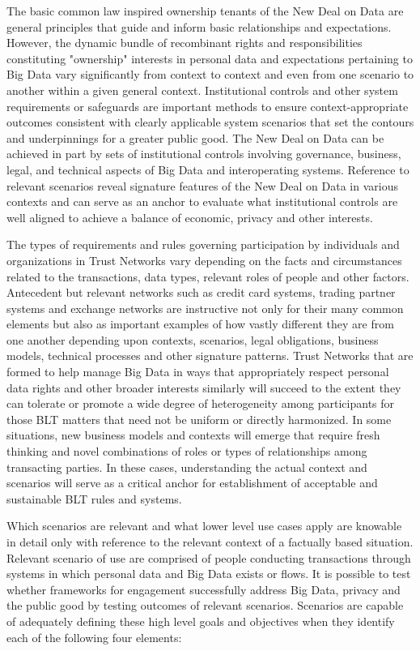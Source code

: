 The basic common law inspired ownership tenants of the New Deal on Data are general principles that guide and inform basic relationships and expectations.
However, the dynamic bundle of recombinant rights and responsibilities constituting "ownership" interests in personal data and expectations pertaining to Big Data vary significantly from context to context and even from one scenario to another within a given general context.  
Institutional controls and other system requirements or safeguards are important methods to ensure context-appropriate outcomes consistent with clearly applicable system scenarios that set the contours and underpinnings for a greater public good.
The New Deal on Data can be achieved in part by sets of institutional controls involving governance, business, legal, and technical aspects of Big Data and interoperating systems.
Reference to relevant scenarios reveal signature features of the New Deal on Data in various contexts and can serve as an anchor to evaluate what institutional controls are well aligned to achieve a balance of economic, privacy and other interests. 

The types of requirements and rules governing participation by individuals and organizations in Trust Networks vary depending on the facts and circumstances related to the transactions, data types, relevant roles of people and other factors. 
Antecedent but relevant networks such as credit card systems, trading partner systems and exchange networks are instructive not only for their many common elements but also as important examples of how vastly different they are from one another depending upon contexts, scenarios, legal obligations, business models, technical processes and other signature patterns.
Trust Networks that are formed to help manage Big Data in ways that appropriately respect personal data rights and other broader interests similarly will succeed to the extent they can tolerate or promote a wide degree of heterogeneity among participants for those BLT matters that need not be uniform or directly harmonized.
In some situations, new business models and contexts will emerge that require fresh thinking and novel combinations of roles or types of relationships among transacting parties.
In these cases, understanding the actual context and scenarios will serve as a critical anchor for establishment of acceptable and sustainable BLT rules and systems.  

Which scenarios are relevant and what lower level use cases apply are knowable in detail only with reference to the relevant context of a factually based situation.
Relevant scenario of use are comprised of people conducting transactions through systems in which personal data and Big Data exists or flows.
It is possible to test whether frameworks for engagement successfully address Big Data, privacy and the public good by testing outcomes of relevant scenarios. 
Scenarios are capable of adequately defining these high level goals and objectives when they identify each of the following four elements:  

